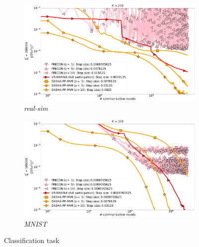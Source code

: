 \documentclass[10pt]{article}
\begin{document}
\begin{figure}[H]
    \begin{subfigure}{.5\textwidth}
        \includegraphics[width=\textwidth]{tmp_launch/neurips_2022_stochastic_real-sim_nof_200_numnodes_10_probs_mega_batch_100000_fix_nm_bug.pdf}
        \caption{\textit{real-sim}}
    \end{subfigure}
    \begin{subfigure}{.5\textwidth}
        \includegraphics[width=\textwidth]{tmp_launch/neurips_2023_stochastic_mnist_nof_100_numnodes_10_probs_mega_batch_100000_batch_size_10_longer.pdf}
        \caption{\textit{MNIST}}
    \end{subfigure}
\caption{Classification task}
\label{fig:stochastic}
\end{figure}

\end{document}
